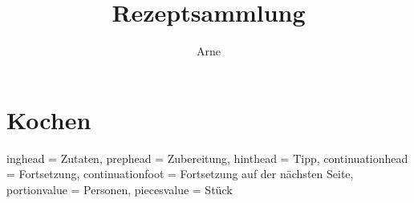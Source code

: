 \documentclass[%
a4paper,
11pt
]{article}
\title{Rezeptsammlung}
\author{Arne}
\numberwithin{page}{section}
\begin{document}


\tableofcontents

\vspace{5em}


\section{Kochen}
\setcounter{page}{1}
\pagebreak


\setHeadlines
{%
    inghead = Zutaten,
    prephead = Zubereitung,
    hinthead = Tipp,
    continuationhead = Fortsetzung,
    continuationfoot = Fortsetzung auf der nächsten Seite,
    portionvalue = Personen,
    piecesvalue = Stück
}
\end{document}
